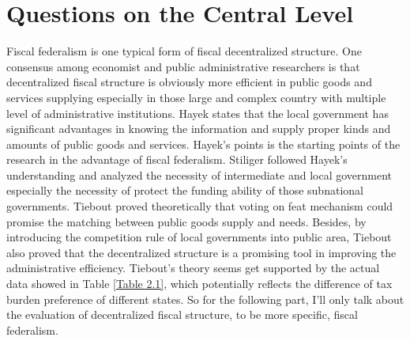 
\chapter{Questions on the Central Level}
Fiscal federalism is one typical form of fiscal decentralized structure. One consensus among economist and public administrative researchers is that decentralized fiscal structure is obviously more efficient in public goods and services supplying especially in those large and complex country with multiple level of administrative institutions. Hayek \cite{hayek2009use} states that the local government has significant advantages in knowing the information and supply proper kinds and amounts of public goods and services. Hayek's points is the starting points of the research in the advantage of fiscal federalism. Stiliger \cite{stigler1998tenable} followed Hayek's understanding and analyzed the necessity of intermediate and local government especially the necessity of protect the funding ability of those subnational governments. Tiebout \cite{tiebout1956pure} proved theoretically that voting on feat mechanism could promise the matching between public goods supply and needs. Besides, by introducing the competition rule of local governments into public area, Tiebout also proved that the decentralized structure is a promising tool in improving the administrative efficiency. Tiebout's theory seems get supported by the actual data showed in Table \ref*{Table 2.1}, which potentially reflects the difference of tax burden preference of different states. So for the following part, I'll only talk about the evaluation of decentralized fiscal structure, to be more specific, fiscal federalism.


